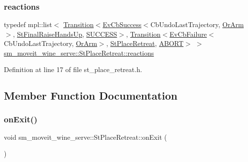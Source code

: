 \subsubsection{\texorpdfstring{reactions}{reactions}}
{\footnotesize\ttfamily typedef mpl\+::list$<$ \hyperlink{classsmacc_1_1Transition}{Transition}$<$\hyperlink{structsmacc_1_1EvCbSuccess}{Ev\+Cb\+Success}$<$Cb\+Undo\+Last\+Trajectory, \hyperlink{classsm__moveit__wine__serve_1_1OrArm}{Or\+Arm}$>$, \hyperlink{structsm__moveit__wine__serve_1_1StFinalRaiseHandsUp}{St\+Final\+Raise\+Hands\+Up}, \hyperlink{structsmacc_1_1default__transition__tags_1_1SUCCESS}{S\+U\+C\+C\+E\+SS}$>$, \hyperlink{classsmacc_1_1Transition}{Transition}$<$\hyperlink{structsmacc_1_1EvCbFailure}{Ev\+Cb\+Failure}$<$Cb\+Undo\+Last\+Trajectory, \hyperlink{classsm__moveit__wine__serve_1_1OrArm}{Or\+Arm}$>$, \hyperlink{structsm__moveit__wine__serve_1_1StPlaceRetreat}{St\+Place\+Retreat}, \hyperlink{structsmacc_1_1default__transition__tags_1_1ABORT}{A\+B\+O\+RT}$>$ $>$ \hyperlink{structsm__moveit__wine__serve_1_1StPlaceRetreat_ad79f082a8f181baac1ca456c08b70b0f}{sm\+\_\+moveit\+\_\+wine\+\_\+serve\+::\+St\+Place\+Retreat\+::reactions}}



Definition at line 17 of file st\+\_\+place\+\_\+retreat.\+h.



\subsection{Member Function Documentation}
\mbox{\label{structsm__moveit__wine__serve_1_1StPlaceRetreat_a5ad3c6c22499c5853f73dcb1d9009bf2}} 
\subsubsection{\texorpdfstring{on\+Exit()}{onExit()}\hspace{0.1cm}{\footnotesize\ttfamily [1/2]}}
{\footnotesize\ttfamily void sm\+\_\+moveit\+\_\+wine\+\_\+serve\+::\+St\+Place\+Retreat\+::on\+Exit (\begin{DoxyParamCaption}\item[{\hyperlink{structsmacc_1_1default__transition__tags_1_1SUCCESS}{S\+U\+C\+C\+E\+SS}}]{ }\end{DoxyParamCaption})\hspace{0.3cm}{\ttfamily [inline]}}



